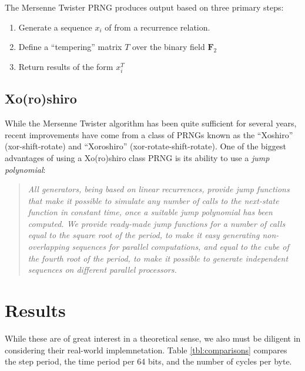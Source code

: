 \documentclass{article}
\begin{document}
            The Mersenne Twister PRNG produces output based on three primary steps:

            \begin{enumerate}
                \item Generate a sequence $x_i$ of from a recurrence relation.
                \item Define a ``tempering'' matrix $T$ over the binary field $\mathbf{F}_2$
                \item Return results of the form $x_i^T$
            \end{enumerate}

        \subsection*{Xo(ro)shiro}

            While the Mersenne Twister algorithm has been quite sufficient for several years, recent improvements have come from a class of PRNGs known as the ``Xoshiro'' (xor-shift-rotate) and ``Xoroshiro'' (xor-rotate-shift-rotate).  One of the biggest advantages of using a Xo(ro)shiro class PRNG is its ability to use a \emph{jump polynomial}\cite{Shootout}:

            \begin{quote}
                \textit{All generators, being based on linear recurrences, provide jump functions that make it possible to simulate any number of calls to the next-state function in constant time, once a suitable jump polynomial has been computed. We provide ready-made jump functions for a number of calls equal to the square root of the period, to make it easy generating non-overlapping sequences for parallel computations, and equal to the cube of the fourth root of the period, to make it possible to generate independent sequences on different parallel processors.}
            \end{quote}

    \section*{Results}

        While these are of great interest in a theoretical sense, we also must be diligent in considering their real-world implemnetation. Table \ref{tbl:comparisons} compares the step period, the time period per 64 bits, and the number of cycles per byte\cite{Shootout}.
\end{document}
